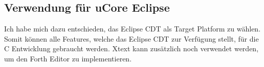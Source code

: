 \subsection{Verwendung für uCore Eclipse}
Ich habe mich dazu entschieden, das Eclipse CDT als Target Platform zu wählen. Somit können alle Features, welche das Eclipse CDT zur Verfügung stellt, für die C Entwicklung gebraucht werden. Xtext kann zusätzlich noch verwendet werden, um den Forth Editor zu implementieren.
